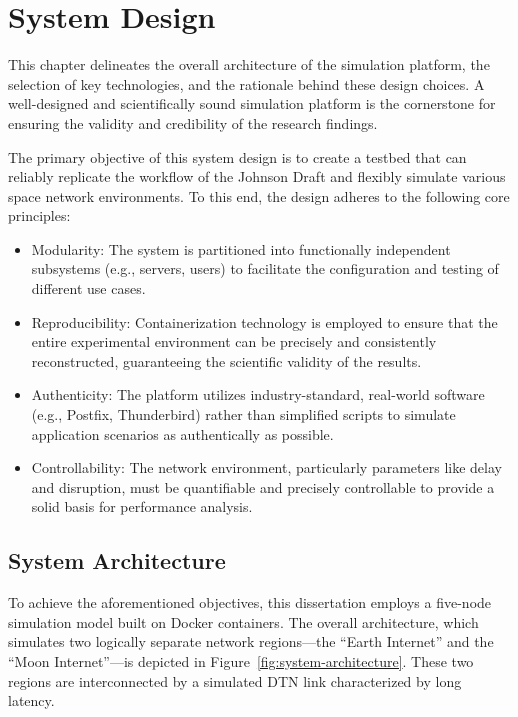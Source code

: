 \chapter{System Design}
This chapter delineates the overall architecture of the simulation platform, the selection of key technologies, and the rationale behind these design choices. A well-designed and scientifically sound simulation platform is the cornerstone for ensuring the validity and credibility of the research findings.

The primary objective of this system design is to create a testbed that can reliably replicate the workflow of the Johnson Draft and flexibly simulate various space network environments. To this end, the design adheres to the following core principles:

\begin{itemize}
    \item Modularity: The system is partitioned into functionally independent subsystems (e.g., servers, users) to facilitate the configuration and testing of different use cases.
    \item Reproducibility: Containerization technology is employed to ensure that the entire experimental environment can be precisely and consistently reconstructed, guaranteeing the scientific validity of the results.
    \item Authenticity: The platform utilizes industry-standard, real-world software (e.g., Postfix, Thunderbird) rather than simplified scripts to simulate application scenarios as authentically as possible.
    \item Controllability: The network environment, particularly parameters like delay and disruption, must be quantifiable and precisely controllable to provide a solid basis for performance analysis.
\end{itemize}

\section{System Architecture}

To achieve the aforementioned objectives, this dissertation employs a five-node simulation model built on Docker containers. The overall architecture, which simulates two logically separate network regions—the ``Earth Internet'' and the ``Moon Internet''—is depicted in Figure~\ref{fig:system-architecture}. These two regions are interconnected by a simulated DTN link characterized by long latency.

